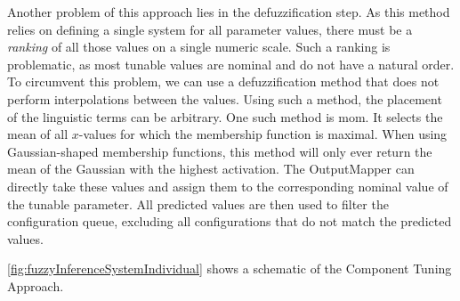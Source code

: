 Another problem of this approach lies in the defuzzification step. As this method relies on defining a single system for all parameter values, there must be a \emph{ranking} of all those values on a single numeric scale. Such a ranking is problematic, as most tunable values are nominal and do not have a natural order. To circumvent this problem, we can use a defuzzification method that does not perform interpolations between the values. Using such a method, the placement of the linguistic terms can be arbitrary. One such method is \gls{mom}. It selects the mean of all $x$-values for which the membership function is maximal. When using Gaussian-shaped membership functions, this method will only ever return the mean of the Gaussian with the highest activation. The OutputMapper can directly take these values and assign them to the corresponding nominal value of the tunable parameter. All predicted values are then used to filter the configuration queue, excluding all configurations that do not match the predicted values.

\autoref{fig:fuzzyInferenceSystemIndividual} shows a schematic of the Component Tuning Approach.


